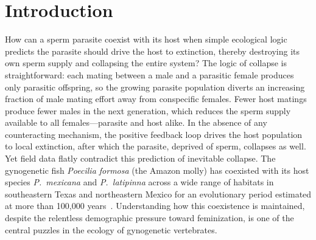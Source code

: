 \documentclass[12pt]{article}
\begin{document}
\section{Introduction}
How can a sperm parasite coexist with its host when simple ecological logic predicts the parasite should drive the host to extinction, thereby destroying its own sperm supply and collapsing the entire system?  The logic of collapse is straightforward: each mating between a male and a parasitic female produces only parasitic offspring, so the growing parasite population diverts an increasing fraction of male mating effort away from conspecific females.  Fewer host matings produce fewer males in the next generation, which reduces the sperm supply available to all females---parasite and host alike.  In the absence of any counteracting mechanism, the positive feedback loop drives the host population to local extinction, after which the parasite, deprived of sperm, collapses as well.  Yet field data flatly contradict this prediction of inevitable collapse.  The gynogenetic fish \textit{Poecilia formosa} (the Amazon molly) has coexisted with its host species \textit{P.~mexicana} and \textit{P.~latipinna} across a wide range of habitats in southeastern Texas and northeastern Mexico for an evolutionary period estimated at more than 100{,}000 years~\citep{Avise1991}.  Understanding how this coexistence is maintained, despite the relentless demographic pressure toward feminization, is one of the central puzzles in the ecology of gynogenetic vertebrates.
\end{document}
